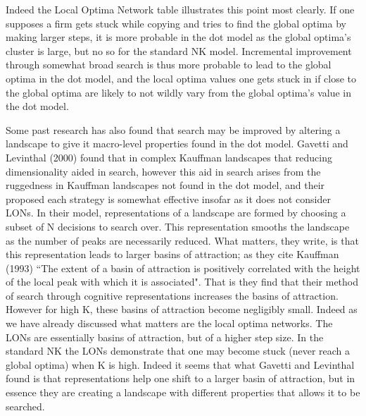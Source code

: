 \documentclass[11pt, oneside]{article}   	%
\begin{document}
Indeed the Local Optima Network table illustrates this point most clearly. If one supposes a firm gets stuck while copying and tries to find the global optima by making larger steps, it is more probable in the dot model as the global optima's cluster is large, but no so for the standard NK model. Incremental improvement through somewhat broad search is thus more probable to lead to the global optima in the dot model, and the local optima values one gets stuck in if close to the global optima are likely to not wildly vary from the global optima's value in the dot model.

Some past research has also found that search may be improved by altering a landscape to give it macro-level properties found in the dot model. Gavetti and Levinthal (2000) found that in complex Kauffman landscapes that reducing dimensionality aided in search, however this aid in search arises from the ruggedness in Kauffman landscapes not found in the dot model, and their proposed each strategy is somewhat effective insofar as it does not consider LONs. In their model, representations of a landscape are formed by choosing a subset of N decisions to search over. This representation smooths the landscape as the number of peaks are necessarily reduced. What matters, they write, is that this representation leads to larger basins of attraction; as they cite Kauffman (1993) ``The extent of a basin of attraction is positively correlated with the height of the local peak with which it is associated". That is they find that their method of search through cognitive representations increases the basins of attraction. However for high K, these basins of attraction become negligibly small. Indeed as we have already discussed what matters are the local optima networks. The LONs are essentially basins of attraction, but of a higher step size. In the standard NK the LONs demonstrate that one may become stuck (never reach a global optima) when K is high. Indeed it seems that what Gavetti and Levinthal found is that representations help one shift to a larger basin of attraction, but in essence they are creating a landscape with different properties that allows it to be searched. 
\end{document}
